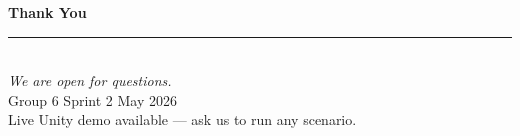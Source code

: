 \documentclass[aspectratio=169,10pt]{beamer}
\begin{document}
\begin{frame}[plain]
\vfill\centering
{\color{white}\bfseries\Huge Thank You}\\[0.45cm]
{\color{white}\rule{2.5cm}{1.5pt}}\\[0.45cm]
{\color{white}\itshape\Large We are open for questions.}\\[0.6cm]
{\color{white}\normalsize Group 6 \quad\textbar\quad Sprint 2 \quad\textbar\quad May 2026}\\[0.3cm]
{\color{white!70}\footnotesize Live Unity demo available --- ask us to run any scenario.}
\vfill
\end{frame}
\end{document}
